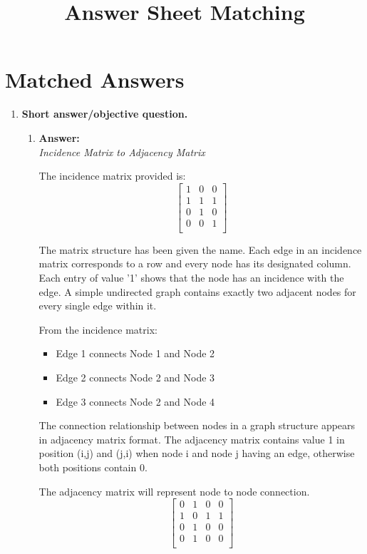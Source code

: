 \documentclass[a4paper,12pt]{article}
\title{Answer Sheet Matching}
\author{}
\date{}
\begin{document}
\maketitle

\section*{Matched Answers}

\begin{enumerate}[label=\textbf{Q\arabic*.}]
    \item \textbf{Short answer/objective question.}
    \begin{enumerate}[label=(\alph*)]
        \item \textbf{Answer:} \\
        \textit{Incidence Matrix to Adjacency Matrix}

        The incidence matrix provided is:
        \[
        \begin{bmatrix}
        1 & 0 & 0 \\
        1 & 1 & 1 \\
        0 & 1 & 0 \\
        0 & 0 & 1 \\
        \end{bmatrix}
        \]

        The matrix structure has been given the name. Each edge in an incidence matrix corresponds to a row and every node has its designated column. Each entry of value '1' shows that the node has an incidence with the edge. A simple undirected graph contains exactly two adjacent nodes for every single edge within it.

        From the incidence matrix:
        \begin{itemize}
            \item Edge 1 connects Node 1 and Node 2
            \item Edge 2 connects Node 2 and Node 3
            \item Edge 3 connects Node 2 and Node 4
        \end{itemize}

        The connection relationship between nodes in a graph structure appears in adjacency matrix format. The adjacency matrix contains value 1 in position (i,j) and (j,i) when node i and node j having an edge, otherwise both positions contain 0.

        The adjacency matrix will represent node to node connection.
        \[
        \begin{bmatrix}
        0 & 1 & 0 & 0 \\
        1 & 0 & 1 & 1 \\
        0 & 1 & 0 & 0 \\
        0 & 1 & 0 & 0 \\
        \end{bmatrix}
        \]
        

\end{enumerate}
\end{enumerate}
\end{document}

